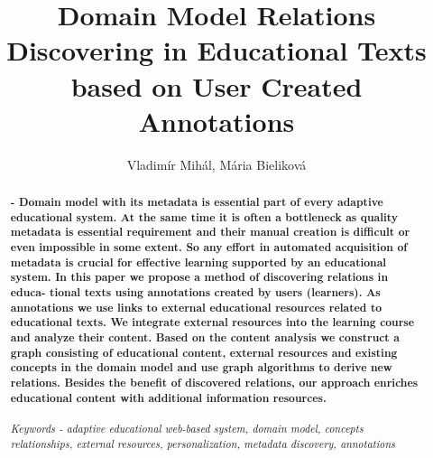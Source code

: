 \documentclass{llncs}
\begin{document}

\title{Domain Model Relations Discovering in Educational Texts based on User Created Annotations}
%
%
\author{Vladim\'{i}r Mih\'{a}l, M\'{a}ria Bielikov\'{a} }
%
\authorrunning{} %
%
\maketitle            
\begin{abstract}
\textbf{- Domain model with its metadata is essential part of every adaptive educational system. At the same time it is often a bottleneck as quality metadata is essential requirement and their manual creation is difficult or even impossible in some extent. So any effort in automated acquisition of metadata is crucial for effective learning supported by an educational system. In this paper we propose a method of discovering relations in educa- tional texts using annotations created by users (learners). As annotations we use links to external educational resources related to educational texts. We integrate external resources into the learning course and analyze their content. Based on the content analysis we construct a graph consisting of educational content, external resources and existing concepts in the domain model and use graph algorithms to derive new relations. Besides the benefit of discovered relations, our approach enriches educational content with additional information resources.}\\
\\
\textit {Keywords - adaptive educational web-based system, domain model, concepts relationships, external resources, personalization, metadata discovery, annotations}
\end{abstract}
%
\end{document}
